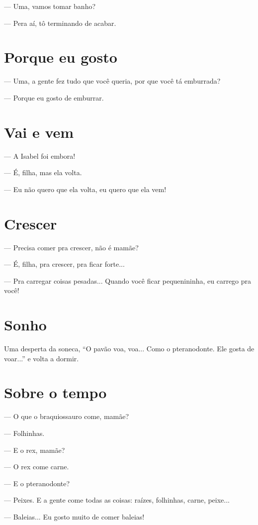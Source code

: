 — Uma, vamos tomar banho?

— Pera aí, tô terminando de acabar.

\chapter{Porque eu gosto}

— Uma, a gente fez tudo que você queria, por que você tá emburrada?

— Porque eu gosto de emburrar.

\chapter{Vai e vem}

— A Isabel foi embora!

— É, filha, mas ela volta.

— Eu não quero que ela volta, eu quero que ela vem!

\chapter{Crescer}

— Precisa comer pra crescer, não é mamãe?

— É, filha, pra crescer, pra ficar forte...

— Pra carregar coisas pesadas... Quando você ficar pequenininha, eu
carrego pra você!

\chapter{Sonho}

Uma desperta da soneca, ``O pavão voa, voa... Como o pteranodonte. Ele
gosta de voar...'' e volta a dormir.

\chapter{Sobre o tempo}

— O que o braquiossauro come, mamãe?

— Folhinhas.

— E o rex, mamãe?

— O rex come carne.

— E o pteranodonte?

— Peixes. E a gente come todas as coisas: raízes, folhinhas, carne,
peixe...

— Baleias... Eu gosto muito de comer baleias!

